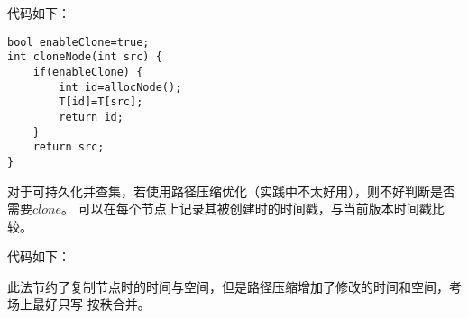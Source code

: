 代码如下：
\begin{lstlisting}[title=cloneA]
bool enableClone=true;
int cloneNode(int src) {
    if(enableClone) {
        int id=allocNode();
        T[id]=T[src];
        return id;
    }
    return src;
}
\end{lstlisting}
对于可持久化并查集，若使用路径压缩优化（实践中不太好用），则不好判断是否需要$clone$。
可以在每个节点上记录其被创建时的时间戳，与当前版本时间戳比较。

代码如下：

此法节约了复制节点时的时间与空间，但是路径压缩增加了修改的时间和空间，考场上最好只写
按秩合并。
